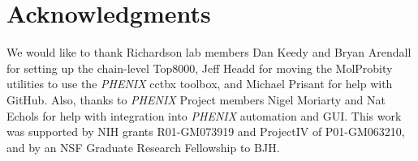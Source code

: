 \section{Acknowledgments}
We would like to thank Richardson lab members Dan Keedy and Bryan Arendall for setting up the chain-level Top8000, Jeff Headd for moving the MolProbity utilities to use the \textit{PHENIX} cctbx toolbox, and Michael Prisant for help with GitHub. Also, thanks to \textit{PHENIX} Project members Nigel Moriarty and Nat Echols for help with integration into \textit{PHENIX} automation and GUI. This work was supported by NIH grants R01-GM073919 and ProjectIV of P01-GM063210, and by an NSF Graduate Research Fellowship to BJH.